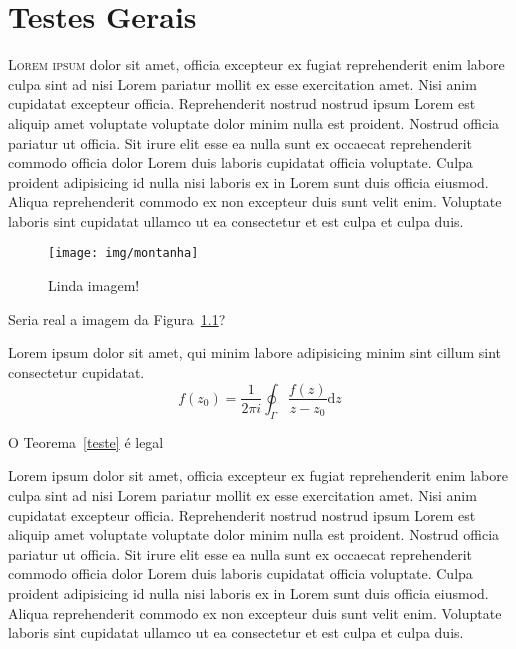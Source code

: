 \documentclass[12pt]{../libellum}
\begin{document}
 
%
%
  \sumario
%
%
  \blinddocument
%
  \blindtext {}


  \chapter{Testes Gerais}
   \lettrine[lines=3]{\initial\color{azulUFRB} L}{orem ipsum} dolor sit amet, officia excepteur ex fugiat reprehenderit enim labore culpa sint ad nisi Lorem pariatur mollit ex esse exercitation amet. Nisi anim cupidatat excepteur officia. Reprehenderit nostrud nostrud ipsum Lorem est aliquip amet voluptate voluptate dolor minim nulla est proident. Nostrud officia pariatur ut officia. Sit irure elit esse ea nulla sunt ex occaecat reprehenderit commodo officia dolor Lorem duis laboris cupidatat officia voluptate. Culpa proident adipisicing id nulla nisi laboris ex in Lorem sunt duis officia eiusmod. Aliqua reprehenderit commodo ex non excepteur duis sunt velit enim. Voluptate laboris sint cupidatat ullamco ut ea consectetur et est culpa et culpa duis.

\begin{figure}[!htbp]
  \centering
  \texttt{[image: img/montanha]}
  \caption{Linda imagem!}
  \label{fig:montanha}
\end{figure}

Seria real a imagem da Figura~\ref{fig:montanha}?


 \begin{teorema}[(de Cauchy)]\label{teste}
    Lorem ipsum dolor sit amet, qui minim labore adipisicing minim sint cillum sint consectetur cupidatat.
      \[
        f(z_0) = \frac{1}{2 \pi i} \oint_{\Gamma} \frac{f(z)}{z - z_0} \mathrm{d} z
      \]
 \end{teorema}

O Teorema~\ref{teste} é legal

 Lorem ipsum dolor sit amet, officia excepteur ex fugiat reprehenderit enim labore culpa sint ad nisi Lorem pariatur mollit ex esse exercitation amet. Nisi anim cupidatat excepteur officia. Reprehenderit nostrud nostrud ipsum Lorem est aliquip amet voluptate voluptate dolor minim nulla est proident. Nostrud officia pariatur ut officia. Sit irure elit esse ea nulla sunt ex occaecat reprehenderit commodo officia dolor Lorem duis laboris cupidatat officia voluptate. Culpa proident adipisicing id nulla nisi laboris ex in Lorem sunt duis officia eiusmod. Aliqua reprehenderit commodo ex non excepteur duis sunt velit enim. Voluptate laboris sint cupidatat ullamco ut ea consectetur et est culpa et culpa duis.
\end{document}
